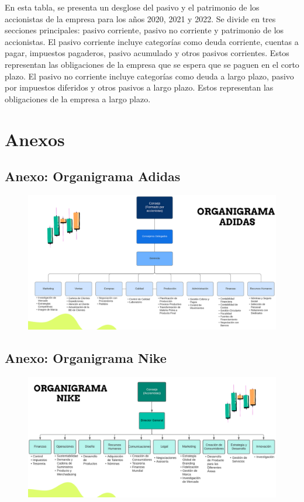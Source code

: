 \documentclass[a4paper,12pt]{article}
\begin{document}
En esta tabla, se presenta un desglose del pasivo y el patrimonio de los accionistas de la empresa para los años 2020, 2021 y 2022.
Se divide en tres secciones principales: pasivo corriente, pasivo no corriente y patrimonio de los accionistas.
El pasivo corriente incluye categorías como deuda corriente, cuentas a pagar, impuestos pagaderos, pasivo acumulado y otros pasivos corrientes. Estos representan las obligaciones de la empresa que se espera que se paguen en el corto plazo.
El pasivo no corriente incluye categorías como deuda a largo plazo, pasivo por impuestos diferidos y otros pasivos a largo plazo. Estos representan las obligaciones de la empresa a largo plazo.



\clearpage
\section{Anexos}

\subsection{Anexo: Organigrama Adidas}

\begin{figure}[ht!]
	\centering

	\includegraphics[width=.9\textwidth]{OAdidas}
\end{figure}

\subsection{Anexo: Organigrama Nike}

\begin{figure}[ht!]
	\centering

	\includegraphics[width=.9\textwidth]{ONike}
\end{figure}
\end{document}
